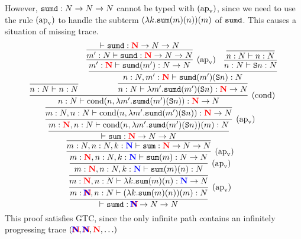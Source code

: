 \documentclass{article}
\newcommand{\bfColor}[2]{{\bf \color{#1}{#2}}}
\newcommand{\Rapv}{\hbox{$(\text{ap}_{\text{v}})$}}
\newcommand{\Rcond}{\hbox{$(\text{cond})$}}
\newcommand{\Sum}{{\tt sum}}
\newcommand{\Sumd}{{\tt sumd}}
\newcommand{\Cond}[2]{\text{cond}(#1,#2)}
\newcommand{\Suc}[1]{{\tt S}#1}
\newcommand{\N}{N}
\newcommand{\rN}{\bfColor{red}{N}}
\newcommand{\bN}{\bfColor{blue}{N}}
\newcommand{\rbN}{\bfColor{red}{N}\hspace{-1em}\bfColor{blue}{N}}
\begin{document}
However, $\Sumd:\N\to\N\to\N$ cannot be typed with $\Rapv$, 
since we need to use the rule $\Rapv$ to handle
the subterm $(\lambda k.\Sum(m)(n))(m)$ of $\Sumd$. 
This causes a situation of missing trace. 
\[
\infer{
  \vdash \Sumd:\rbN\to\N\to\N
}{
  \infer[\Rapv]{
    m:\rbN, n:\N \vdash (\lambda k.\Sum(m)(n))(m):\N
  }{
    \infer{
      m:\rN, n:\N \vdash \lambda k.\Sum(m)(n):\bN\to\N
    }{
      \infer[\Rapv]{
        m:\rN, n:\N, k:\bN \vdash \Sum(m)(n):\N
      }{
        \infer[\Rapv]{
          m:\rN, n:\N, k:\bN \vdash \Sum(m):\N\to\N
        }{
          \infer{
            m:\N, n:\N, k:\bN \vdash \Sum:\rN\to\N\to\N
          }{
            \infer{
              \vdash \Sum:\rN\to\N\to\N
            }{
              \infer[\Rapv]{
                m:\rN,n:\N\vdash\Cond{n}{\lambda m'.\Sumd(m')(\Suc{n})}(m):\N
              }{
                \infer{
                  m:\N,n:\N\vdash\Cond{n}{\lambda m'.\Sumd(m')(\Suc{n})}:\rN\to\N
                }{
                  \infer[\Rcond]{
                    n:\N\vdash\Cond{n}{\lambda m'.\Sumd(m')(\Suc{n})}:\rN\to\N
                  }{
                    \infer{
                      n:\N \vdash n:\N
                    }{}
                    &
                    \infer{
                      n:\N\vdash\lambda m'.\Sumd(m')(\Suc{n}):\rN\to\N
                    }{
                      \infer{
                        n:\N,m':\rN\vdash\Sumd(m')(\Suc{n}):\N
                      }{
                        \infer[\Rapv]{
                          m':\rN\vdash\Sumd(m'):\N\to\N
                        }{
                          \infer{
                            m':\N\vdash\Sumd:\rN\to\N\to\N
                          }{
                            \vdash\Sumd:\rN\to\N\to\N
                          }
                        }
                        &
                        \infer{
                          n:\N\vdash\Suc{n}:\N
                        }{
                          \infer{
                            n:\N\vdash n:\N
                          }{}
                        }
                      }
                    }
                  }
                }
              }
            }
          }
        }
      }
    }
  }
}
\]
This proof satisfies GTC,
since the only infinite path contains an infinitely progressing trace $(\rbN,\rbN,\rN,\ldots)$
\end{document}

